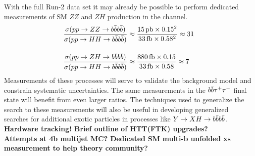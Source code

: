 With the full Run-2 data set it may already be possible to perform dedicated measurements of SM $ZZ$ and $ZH$ production in the \bbbb channel.
\begin{equation*}
  \begin{split}
    \frac{\sigma(pp\rightarrow ZZ\rightarrow b\bar{b}b\bar{b})  }{\sigma(pp\rightarrow HH\rightarrow b\bar{b}b\bar{b})  } &\approx \frac{15\,\rm{pb}\times0.15^2}{33\,\rm{fb}\times0.58^2} \approx 31 \\[10pt]
    \frac{\sigma(pp\rightarrow ZH\rightarrow b\bar{b}b\bar{b})  }{\sigma(pp\rightarrow HH\rightarrow b\bar{b}b\bar{b})  } &\approx \frac{880\,\rm{fb}\times0.15}{33\,\rm{fb}\times0.58} \approx 7
  \end{split}
\end{equation*}
Measurements of these processes will serve to validate the background model and constrain systematic uncertainties.
The same measurements in the $b\bar{b}\tau^+\tau^-$ final state will benefit from even larger ratios. 
The techniques used to generalize the \hh search to these measurements will also be useful in developing generalized \bbbb searches for additional exotic particles in processes like $Y\rightarrow XH\rightarrow b\bar{b}b\bar{b}$.
\\[20pt]
\bf{Hardware tracking! Brief outline of HTT(FTK) upgrades?}
\\[20pt]
\bf{Attempts at 4b multijet MC? Dedicated SM multi-b unfolded xs measurement to help theory community?}




